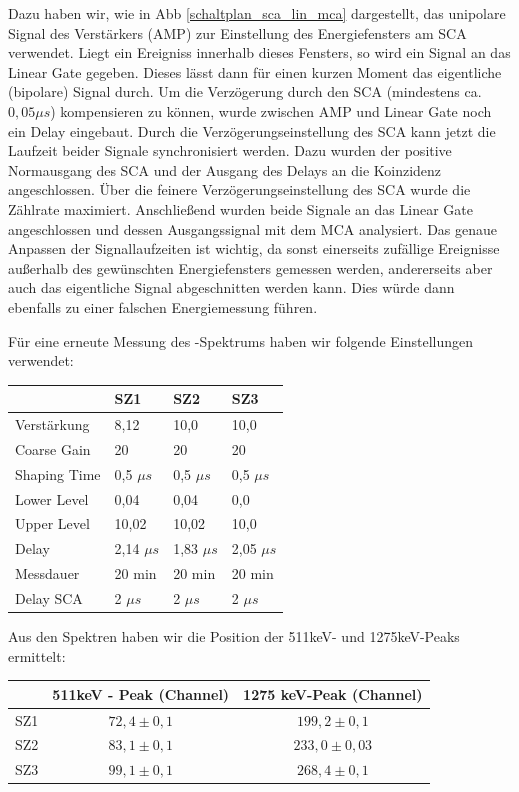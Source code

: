 Dazu haben wir, wie in Abb \ref{schaltplan_sca_lin_mca} dargestellt, das unipolare Signal des Verstärkers (AMP) zur Einstellung des Energiefensters am SCA verwendet. Liegt ein Ereigniss innerhalb dieses Fensters, so wird ein Signal an das Linear Gate gegeben. Dieses lässt dann für einen kurzen Moment das eigentliche (bipolare) Signal durch. Um die Verzögerung durch den SCA (mindestens ca. $0,05\mu s$) kompensieren zu können, wurde zwischen AMP und Linear Gate noch ein Delay eingebaut. Durch die Verzögerungseinstellung des SCA kann jetzt die Laufzeit beider Signale synchronisiert werden. Dazu wurden der positive Normausgang des SCA und der Ausgang des Delays an die Koinzidenz angeschlossen. Über die feinere Verzögerungseinstellung des SCA wurde die Zählrate maximiert. Anschließend wurden beide Signale an das Linear Gate angeschlossen und dessen Ausgangssignal mit dem MCA analysiert. Das genaue Anpassen der Signallaufzeiten ist wichtig, da sonst einerseits zufällige Ereignisse außerhalb des gewünschten Energiefensters gemessen werden, andererseits aber auch das eigentliche Signal abgeschnitten werden kann. Dies würde dann ebenfalls zu einer falschen Energiemessung führen.

Für eine erneute Messung des \Na-Spektrums haben wir folgende Einstellungen verwendet:
\begin{center}
\begin{tabular}{llll}
\toprule
 & SZ1 & SZ2 & SZ3\\
\midrule
Verstärkung & 8,12 & 10,0 & 10,0\\
Coarse Gain & 20 & 20 & 20\\
Shaping Time & 0,5 $\mu s$ & 0,5 $\mu s$ & 0,5 $\mu s$\\
Lower Level & 0,04 & 0,04 & 0,0\\
Upper Level & 10,02 & 10,02 & 10,0\\
Delay & 2,14 $\mu s$ & 1,83 $\mu s$ & 2,05 $\mu s$\\
Messdauer & 20 min & 20 min & 20 min\\
Delay SCA & 2 $\mu s$ & 2 $\mu s$ & 2 $\mu s$\\
\bottomrule
\end{tabular}
\end{center}

Aus den Spektren haben wir die Position der 511keV- und 1275keV-Peaks ermittelt:  
\begin{center}
\begin{tabular}{lcc}
\toprule
 & 511keV - Peak (Channel) & 1275 keV-Peak (Channel) \\
\midrule
SZ1 & $72,4 \pm 0,1$ & $199,2 \pm 0,1$ \\
SZ2 & $83,1 \pm 0,1$ & $233,0 \pm 0,03$ \\
SZ3 & $99,1 \pm 0,1$ & $268,4 \pm 0,1$ \\
\bottomrule 
\end{tabular}
\end{center}

